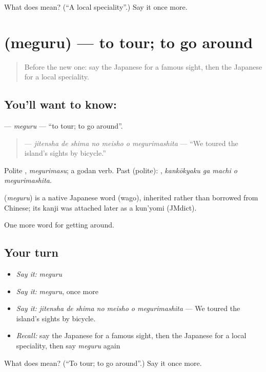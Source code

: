 \begin{tcolorbox}[breakable,colback=teal!4,colframe=teal!35!black,title={Before you move on}]
What does  mean? (\textquotedblleft{}A local speciality\textquotedblright{}.) Say it once more.
\end{tcolorbox}
\section[\texorpdfstring{\ja{めぐる} (meguru)}{めぐる (meguru)}]{ (meguru) — to tour; to go around}

\label{lesson:JA-C402-meguru}



\begin{quote}
Before the new one: say the Japanese for a famous sight, then the Japanese for a local speciality.
\end{quote}

\subsection*{You'll want to know: }
\textbf{} — \emph{meguru} — \textquotedblleft{}to tour; to go around\textquotedblright{}.

\begin{quote}
\textbf{   } — \emph{jitensha de shima no meisho o megurimashita} — \textquotedblleft{}We toured the island's sights by bicycle.\textquotedblright{}
\end{quote}

Polite \textbf{}, \emph{megurimasu}; a godan verb. Past (polite): \textbf{  }, \emph{kankōkyaku ga machi o megurimashita}.

\begin{cousinweb}
\textbf{} (\emph{meguru}) is a native Japanese word (wago), inherited rather than borrowed from Chinese; its kanji was attached later as a kun'yomi (JMdict).
\end{cousinweb}

\begin{grammarlens}[title={What you've built}]
One more word for getting around.
\end{grammarlens}

\subsection*{Your turn}
\begin{itemize}
\raggedright
  \item \emph{Say it:} \emph{meguru}
  \item \emph{Say it:} \emph{meguru}, once more
  \item \emph{Say it:} \emph{jitensha de shima no meisho o megurimashita} — We toured the island's sights by bicycle.
  \item \emph{Recall:} say the Japanese for a famous sight, then the Japanese for a local speciality, then say \emph{meguru} again
\end{itemize}

\begin{tcolorbox}[breakable,colback=teal!4,colframe=teal!35!black,title={Before you move on}]
What does  mean? (\textquotedblleft{}To tour; to go around\textquotedblright{}.) Say it once more.
\end{tcolorbox}
